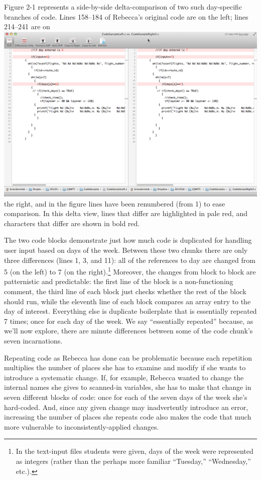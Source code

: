 Figure 2-1 represents a side-by-side delta-comparison of two such day-specific branches of code. Lines 158--184 of Rebecca's original code are on the left; lines 214--241 are on \includegraphics{media/media/image3.png}the right, and in the figure lines have been renumbered (from 1) to ease comparison. In this delta view, lines that differ are highlighted in pale red, and characters that differ are shown in bold red.

The two code blocks demonstrate just how much code is duplicated for handling user input based on days of the week. Between these two chunks there are only three differences (lines 1, 3, and 11): all of the references to day are changed from 5 (on the left) to 7 (on the right).\footnote{In the text-input files students were given, days of the week were represented as integers (rather than the perhaps more familiar ``Tuesday,'' ``Wednesday,'' etc.).} Moreover, the changes from block to block are patternistic and predictable: the first line of the block is a non-functioning comment, the third line of each block just checks whether the rest of the block should run, while the eleventh line of each block compares an array entry to the day of interest. Everything else is duplicate boilerplate that is essentially repeated 7 times; once for each day of the week. We say ``essentially repeated'' because, as we'll now explore, there are minute differences between some of the code chunk's seven incarnations.

Repeating code as Rebecca has done can be problematic because each repetition multiplies the number of places she has to examine and modify if she wants to introduce a systematic change. If, for example, Rebecca wanted to change the internal names she gives to scanned-in variables, she has to make that change in seven different blocks of code: once for each of the seven days of the week she's hard-coded. And, since any given change may inadvertently introduce an error, increasing the number of places she repeats code also makes the code that much more vulnerable to inconsistently-applied changes.

